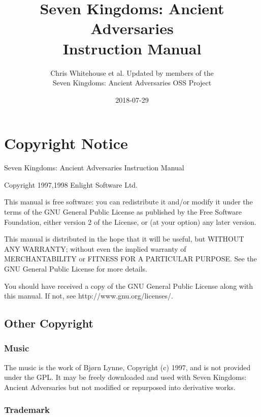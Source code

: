 \documentclass[openany]{book}
\begin{document}
\begin{titlepage}
	\title{Seven Kingdoms: Ancient Adversaries \\
		Instruction Manual}
	\author{Chris Whitehouse et al. Updated by members of the \\
		Seven Kingdoms: Ancient Adversaries OSS Project} %
	\date{2018-07-29} %
\end{titlepage}
\frontmatter
\maketitle

\section{Copyright Notice}

Seven Kingdoms: Ancient Adversaries Instruction Manual

Copyright 1997,1998 Enlight Software Ltd.

This manual is free software: you can redistribute it and/or modify it under the terms of the GNU General Public License as published by the Free Software Foundation, either version 2 of the License, or (at your option) any later version.

This manual is distributed in the hope that it will be useful, but WITHOUT ANY WARRANTY; without even the implied warranty of MERCHANTABILITY or FITNESS FOR A PARTICULAR PURPOSE.  See the GNU General Public License for more details.

You should have received a copy of the GNU General Public License along with this manual. If not, see http://www.gnu.org/licenses/.

\subsection{Other Copyright}

\subsubsection{Music}

The music is the work of Bjørn Lynne, Copyright (c) 1997, and is not provided under the GPL. It may be freely downloaded and used with Seven Kingdoms: Ancient Adversaries but not modified or repurposed into derivative works. 

\subsubsection{Trademark}
\end{document}
